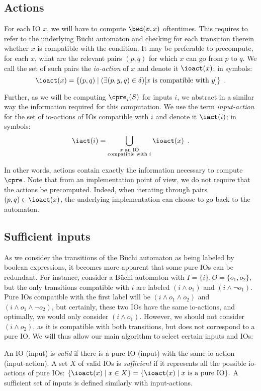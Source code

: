 \documentclass[runningheads,a4paper]{llncs}
\begin{document}
\subsection{Actions}

For each IO \(x\), we will have to compute \(\bwd(\vec{v}, x)\) oftentimes.  This
requires to refer to the underlying Büchi automaton and checking for each
transition therein whether \(x\) is compatible with the condition.  It may be
preferable to precompute, for each \(x\), what are the relevant pairs \((p, q)\) for
which \(x\) can go from \(p\) to \(q\).  We call the set of such pairs the
\emph{io-action} of \(x\) and denote it \(\ioact(x)\); in symbols:
\[\ioact(x) = \{(p, q) \mid (\exists (p, y, q) \in \delta)[x \text{ is compatible with }
y]\}\enspace.\]

Further, as we will be computing \(\cpre_i(S)\) for inputs \(i\), we abstract in a
similar way the information required for this computation.  We use the term
\emph{input-action} for the set of io-actions of IOs compatible with \(i\) and denote
it \(\iact(i)\); in symbols:
\[\iact(i) = \bigcup_{\substack{x \text{ an IO}\\\text{compatible with }i}} \ioact(x) \enspace.\]

In other words, actions contain exactly the information necessary to compute
\(\cpre\).  Note that from an implementation point of view, we do not require that
the actions be precomputed.  Indeed, when iterating through pairs
\((p, q) \in \ioact(x)\), the underlying implementation can choose to go back to the
automaton.

\subsection{Sufficient inputs}\label{sec:sufficient}

As we consider the transitions of the Büchi automaton as being labeled by
boolean expressions, it becomes more apparent that some pure IOs can be
redundant.  For instance, consider a Büchi automaton with
\(I = \{i\}, O = \{o_1, o_2\}\), but the only transitions compatible with \(i\) are
labeled \((i \land o_1)\) and \((i \land \neg o_1)\).  Pure IOs compatible with the first
label will be \((i \land o_1 \land o_2)\) and \((i \land o_1 \land \neg o_2)\), but
certainly, these two IOs have the same io-actions, and optimally, we would only
consider \((i \land o_1)\).  However, we should not consider \((i \land o_2)\), as it is
compatible with both transitions, but does not correspond to a pure IO.  We will
thus allow our main algorithm to select certain inputs and IOs:
\begin{definition}
  An IO (\resp input) is \emph{valid} if there is a pure IO (\resp input) with
  the same io-action (\resp input-action).  A set \(X\) of valid IOs is
  \emph{sufficient} if it represents all the possible io-actions of pure IOs:
  \(\{\ioact(x) \mid x \in X\} = \{\ioact(x) \mid x \text{ is a pure IO}\}.\)
  A sufficient set of inputs is defined similarly with input-actions.
\end{definition}
\end{document}
